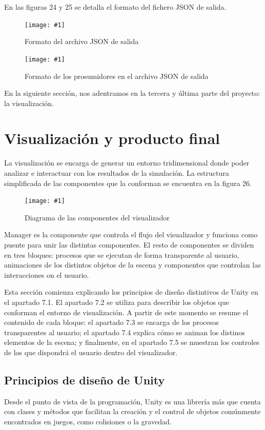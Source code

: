 \documentclass[12pt,a4paper,openright,oneside]{article}
\newcommand{\includeImage}[3]
{
	\begin{figure}[H]
	\begin{center}
	\texttt{[image: \#1]}
	\end{center}
	\caption{#3}
	\end{figure}
}
\numberwithin{equation}{section}
\theoremstyle{definition}
\begin{document}
En las figuras 24 y 25 se detalla el formato del fichero JSON de salida.

\includeImage{output_general.png}{10}{Formato del archivo JSON de salida}

\includeImage{output_prosumer.png}{10}{Formato de los prosumidores en el archivo JSON de salida}

\vspace{2cm}

En la siguiente sección, nos adentramos en la tercera y última parte del proyecto: la visualización.
\newpage




\section{Visualización y producto final}

La visualización se encarga de generar un entorno tridimensional donde poder analizar e interactuar con los resultados de la simulación. La estructura simplificada de las componentes que la conforman se encuentra en la figura 26.


\includeImage{visualization.png}{18}{Diagrama de las componentes del visualizador}

Manager es la componente que controla el flujo del visualizador y funciona como puente para unir las distintas componentes. El resto de componentes se dividen en tres bloques: procesos que se ejecutan de forma transparente al usuario, animaciones de los distintos objetos de la escena y componentes que controlan las interacciones on el usuario.

Esta sección comienza explicando los principios de diseño distintivos de Unity en el apartado 7.1. El apartado 7.2 se utiliza para describir los objetos que conforman el entorno de visualización. A partir de este momento se resume el contenido de cada bloque: el apartado 7.3 se encarga de los procesos transparentes al usuario; el apartado 7.4 explica cómo se animan los distinos elementos de la escena; y finalmente, en el apartado 7.5 se muestran los controles de los que dispondrá el usuario dentro del visualizador.

\subsection{Principios de diseño de Unity}

Desde el punto de vista de la programación, Unity es una librería más que cuenta con clases y métodos que facilitan la creación y el control de objetos comúnmente encontrados en juegos, como colisiones o la gravedad. 
\end{document}
